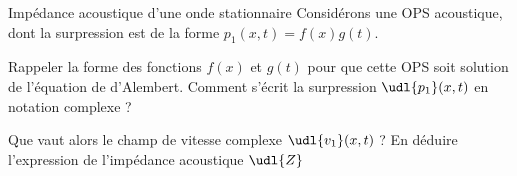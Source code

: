 \begin{exo}[PC][1][colle]{Impédance acoustique d’une onde stationnaire}
    Considérons une OPS acoustique, dont la surpression est de la forme $p_1(x,t) = f(x)g(t)$.
    \begin{quest}
        \item Rappeler la forme des fonctions $f(x)$ et $g(t)$ pour que cette OPS soit solution de l’équation de d’Alembert. Comment s’écrit la surpression $\udl{p_1}(x,t)$ en notation complexe ?
        \item Que vaut alors le champ de vitesse complexe $\udl{v_1}(x,t)$ ? En déduire l’expression de l’impédance acoustique $\udl{Z}$
    \end{quest} 
\end{exo}

